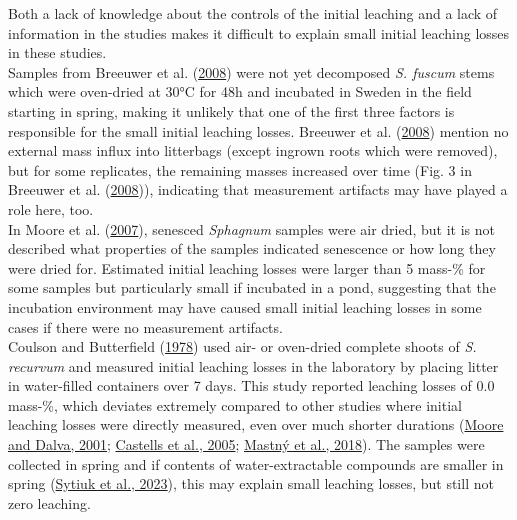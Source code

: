 \documentclass[
  12pt,
]{article}
\begin{document}
Both a lack of knowledge about the controls of the initial leaching and a lack of information in the studies makes it difficult to explain small initial leaching losses in these studies.\\
Samples from Breeuwer et al. (\protect\hyperlink{ref-Breeuwer.2008}{2008}) were not yet decomposed \emph{S. fuscum} stems which were oven-dried at 30°C for 48h and incubated in Sweden in the field starting in spring, making it unlikely that one of the first three factors is responsible for the small initial leaching losses. Breeuwer et al. (\protect\hyperlink{ref-Breeuwer.2008}{2008}) mention no external mass influx into litterbags (except ingrown roots which were removed), but for some replicates, the remaining masses increased over time (Fig. 3 in Breeuwer et al. (\protect\hyperlink{ref-Breeuwer.2008}{2008})), indicating that measurement artifacts may have played a role here, too.\\
In Moore et al. (\protect\hyperlink{ref-Moore.2007}{2007}), senesced \emph{Sphagnum} samples were air dried, but it is not described what properties of the samples indicated senescence or how long they were dried for. Estimated initial leaching losses were larger than 5 mass-\% for some samples but particularly small if incubated in a pond, suggesting that the incubation environment may have caused small initial leaching losses in some cases if there were no measurement artifacts.\\
Coulson and Butterfield (\protect\hyperlink{ref-Coulson.1978}{1978}) used air- or oven-dried complete shoots of \emph{S. recurvum} and measured initial leaching losses in the laboratory by placing litter in water-filled containers over 7 days. This study reported leaching losses of 0.0 mass-\%, which deviates extremely compared to other studies where initial leaching losses were directly measured, even over much shorter durations (\protect\hyperlink{ref-Moore.2001}{Moore and Dalva, 2001}; \protect\hyperlink{ref-Castells.2005}{Castells et al., 2005}; \protect\hyperlink{ref-Mastny.2018}{Mastný et al., 2018}). The samples were collected in spring and if contents of water-extractable compounds are smaller in spring (\protect\hyperlink{ref-Sytiuk.2023}{Sytiuk et al., 2023}), this may explain small leaching losses, but still not zero leaching.
\end{document}
